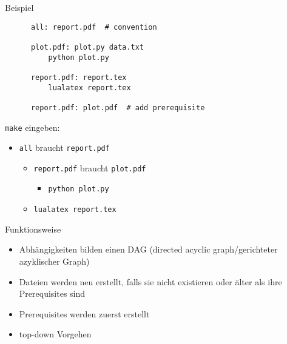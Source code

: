 \begin{frame}[fragile]{Beispiel}
  \begin{center}
    \begin{verbatim}
      all: report.pdf  # convention

      plot.pdf: plot.py data.txt
          python plot.py

      report.pdf: report.tex
          lualatex report.tex

      report.pdf: plot.pdf  # add prerequisite
    \end{verbatim}
  \end{center}
  \vspace{1em}

  \texttt{make} eingeben:
  \begin{itemize}
    \item \texttt{all} braucht \texttt{report.pdf}
      \begin{itemize}
        \item \texttt{report.pdf} braucht \texttt{plot.pdf}
          \begin{itemize}
            \item \texttt{python plot.py}
          \end{itemize}
        \item \texttt{lualatex report.tex}
    \end{itemize}
  \end{itemize}
\end{frame}

\begin{frame}{Funktionsweise}
  \begin{center}
  \end{center}

  \begin{itemize}
    \item Abhängigkeiten bilden einen DAG (directed acyclic graph/gerichteter azyklischer Graph)
    \item Dateien werden neu erstellt, falls sie nicht existieren oder älter als ihre Prerequisites sind
    \item Prerequisites werden zuerst erstellt
    \item top-down Vorgehen
  \end{itemize}
\end{frame}

